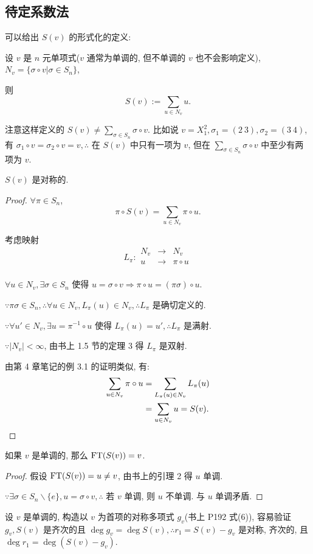 \documentclass[UTF8]{ctexart}
\begin{document}
\subsection{待定系数法}
可以给出 $S(v)$ 的形式化的定义:
\begin{definition}
    设 $v$ 是 $n$ 元单项式($v$ 通常为单调的, 但不单调的 $v$ 也不会影响定义), $N_v=\{\sigma\circ v|\sigma\in S_n\}$,
    
    则
    \[S(v):=\sum_{u\in N_v}u.\]
\end{definition}
注意这样定义的 $S(v)\neq\sum\limits_{\sigma\in S_n}\sigma\circ v$. 比如说 $v=X_1^2,\sigma_1=(2\ 3),\sigma_2=(3\ 4)$, 有 $\sigma_1\circ v=\sigma_2\circ v=v,\therefore$ 在 $S(v)$ 中只有一项为 $v$, 但在 $\sum\limits_{\sigma\in S_n}\sigma\circ v$ 中至少有两项为 $v$.
\begin{theorem}
    $S(v)$ 是对称的.
\end{theorem}
\begin{proof}
    $\forall\pi\in S_n$,
    \[\pi\circ S(v)=\sum_{u\in N_v}\pi\circ u.\]

    考虑映射
    \[L_\pi:\begin{array}{rcl}
        N_v & \to & N_v \\
        u & \to & \pi\circ u \\
    \end{array}\]

    $\forall u\in N_v,\exists\sigma\in S_n$ 使得 $u=\sigma\circ v\Rightarrow\pi\circ u=(\pi\sigma)\circ u$.

    $\because\pi\sigma\in S_n,\therefore\forall u\in N_v,L_\pi(u)\in N_v,\therefore L_\pi$ 是确切定义的.

    $\because\forall u'\in N_v,\exists u=\pi^{-1}\circ u$ 使得 $L_\pi(u)=u',\therefore L_\pi$ 是满射.

    $\because|N_v|<\infty$, 由书上 1.5 节的定理 3 得 $L_\pi$ 是双射.
    
    由第 4 章笔记的例 3.1 的证明类似, 有:
    \begin{align*}
        \sum_{u\in N_v}\pi\circ u & =\sum_{L_\pi(u)\in N_v}L_\pi(u) \\
        & =\sum_{u\in N_v}u=S(v).\qedhere
    \end{align*}
\end{proof}
\begin{theorem}
    如果 $v$ 是单调的, 那么 $\operatorname{FT} (S(v))=v$.
\end{theorem}
\begin{proof}
    假设 $\operatorname{FT} (S(v))=u\neq v$, 由书上的引理 2 得 $u$ 单调.

    $\because\exists\sigma\in S_n\backslash\{e\},u=\sigma\circ v,\therefore$ 若 $v$ 单调, 则 $u$ 不单调. 与 $u$ 单调矛盾.
\end{proof}
设 $v$ 是单调的, 构造以 $v$ 为首项的对称多项式 $g_v$(书上 P192 式(6)), 容易验证 $g_v,S(v)$ 是齐次的且 $\deg g_v=\deg S(v),\therefore r_1=S(v)-g_v$ 是对称, 齐次的, 且 $\deg r_1=\deg(S(v)-g_v)$.
\end{document}
